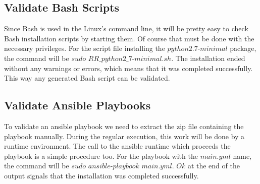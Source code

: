 \subsection*{Validate Bash Scripts}
Since Bash is used in the Linux's command line, it will be pretty easy to check Bash installation scripts by starting them.
Of course that must be done with the necessary privileges.
For the script file installing the $python2.7$-$minimal$ package, the command will be $sudo$ $RR\_python2\_7$-$minimal.sh$.
The installation ended without any warnings or errors, which means that it was completed successfully.
This way any generated Bash script can be validated.

\subsection*{Validate Ansible Playbooks}
To validate an ansible playbook we need to extract the zip file containing the playbook manually. 
During the regular execution, this work will be done by a runtime environment.
The call to the ansible runtime which proceeds the playbook is a simple procedure too.
For the playbook with the $main$.$yml$ name, the command will be $sudo$ $ansible$-$playbook$ $main.yml$.
$Ok$ at the end of the output signals that the installation was completed successfully.
